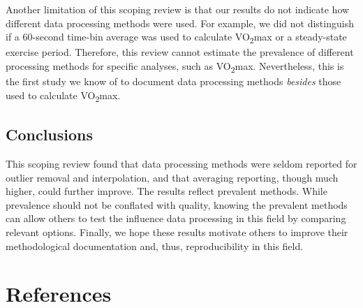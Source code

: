 \documentclass[
  letterpaper,
  DIV=11,
  numbers=noendperiod]{scrartcl}
\begin{document}
Another limitation of this scoping review is that our results do not
indicate how different data processing methods were used. For example,
we did not distinguish if a 60-second time-bin average was used to
calculate VO\textsubscript{2}max or a steady-state exercise period.
Therefore, this review cannot estimate the prevalence of different
processing methods for specific analyses, such as
VO\textsubscript{2}max. Nevertheless, this is the first study we know of
to document data processing methods \emph{besides} those used to
calculate VO\textsubscript{2}max.

\subsection{Conclusions}\label{conclusions}

This scoping review found that data processing methods were seldom
reported for outlier removal and interpolation, and that averaging
reporting, though much higher, could further improve. The results
reflect prevalent methods. While prevalence should not be conflated with
quality, knowing the prevalent methods can allow others to test the
influence data processing in this field by comparing relevant options.
Finally, we hope these results motivate others to improve their
methodological documentation and, thus, reproducibility in this field.

\section*{References}\label{references}
\end{document}
